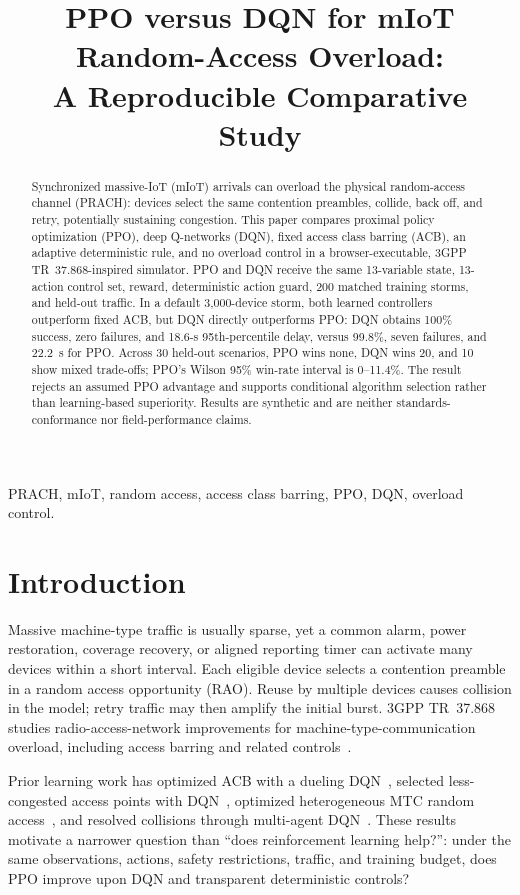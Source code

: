 \documentclass[conference]{IEEEtran}
\title{PPO versus DQN for mIoT Random-Access Overload:\\A Reproducible Comparative Study}
\author{\IEEEauthorblockN{Rao Yenamandra and Mubanga Nsofu}
\IEEEauthorblockA{DigitalTwinSim Research\\
\{raosy@digitaltwinsim.com, mubanga.nsofu@vodacom.co.za\}}}
\begin{document}
\maketitle

\begin{abstract}
Synchronized massive-IoT (mIoT) arrivals can overload the physical random-access channel (PRACH): devices select the same contention preambles, collide, back off, and retry, potentially sustaining congestion. This paper compares proximal policy optimization (PPO), deep Q-networks (DQN), fixed access class barring (ACB), an adaptive deterministic rule, and no overload control in a browser-executable, 3GPP TR~37.868-inspired simulator. PPO and DQN receive the same 13-variable state, 13-action control set, reward, deterministic action guard, 200 matched training storms, and held-out traffic. In a default 3,000-device storm, both learned controllers outperform fixed ACB, but DQN directly outperforms PPO: DQN obtains 100\% success, zero failures, and 18.6-s 95th-percentile delay, versus 99.8\%, seven failures, and 22.2~s for PPO. Across 30 held-out scenarios, PPO wins none, DQN wins 20, and 10 show mixed trade-offs; PPO's Wilson 95\% win-rate interval is 0--11.4\%. The result rejects an assumed PPO advantage and supports conditional algorithm selection rather than learning-based superiority. Results are synthetic and are neither standards-conformance nor field-performance claims.
\end{abstract}

\begin{IEEEkeywords}
PRACH, mIoT, random access, access class barring, PPO, DQN, overload control.
\end{IEEEkeywords}

\section{Introduction}
Massive machine-type traffic is usually sparse, yet a common alarm, power restoration, coverage recovery, or aligned reporting timer can activate many devices within a short interval. Each eligible device selects a contention preamble in a random access opportunity (RAO). Reuse by multiple devices causes collision in the model; retry traffic may then amplify the initial burst. 3GPP TR~37.868 studies radio-access-network improvements for machine-type-communication overload, including access barring and related controls~\cite{tr37868}.

Prior learning work has optimized ACB with a dueling DQN~\cite{bui2020}, selected less-congested access points with DQN~\cite{bekele2021}, optimized heterogeneous MTC random access~\cite{chen2018}, and resolved collisions through multi-agent DQN~\cite{jadoon2022}. These results motivate a narrower question than ``does reinforcement learning help?'': under the same observations, actions, safety restrictions, traffic, and training budget, does PPO improve upon DQN and transparent deterministic controls?
\end{document}
